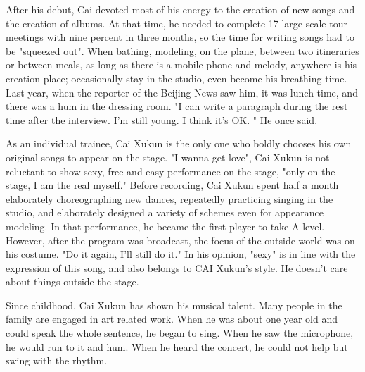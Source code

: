 \documentclass[pdf]{oucthesis}
\begin{document}
\begin{enabstract}
	
After his debut, Cai devoted most of his energy to the creation of new songs and the creation of albums. At that time, he needed to complete 17 large-scale tour meetings with nine percent in three months, so the time for writing songs had to be "squeezed out". When bathing, modeling, on the plane, between two itineraries or between meals, as long as there is a mobile phone and melody, anywhere is his creation place; occasionally stay in the studio, even become his breathing time. Last year, when the reporter of the Beijing News saw him, it was lunch time, and there was a hum in the dressing room. "I can write a paragraph during the rest time after the interview. I'm still young. I think it's OK. " He once said.

As an individual trainee, Cai Xukun is the only one who boldly chooses his own original songs to appear on the stage. "I wanna get love", Cai Xukun is not reluctant to show sexy, free and easy performance on the stage, "only on the stage, I am the real myself." Before recording, Cai Xukun spent half a month elaborately choreographing new dances, repeatedly practicing singing in the studio, and elaborately designed a variety of schemes even for appearance modeling. In that performance, he became the first player to take A-level. However, after the program was broadcast, the focus of the outside world was on his costume. "Do it again, I'll still do it." In his opinion, "sexy" is in line with the expression of this song, and also belongs to CAI Xukun's style. He doesn't care about things outside the stage.

Since childhood, Cai Xukun has shown his musical talent. Many people in the family are engaged in art related work. When he was about one year old and could speak the whole sentence, he began to sing. When he saw the microphone, he would run to it and hum. When he heard the concert, he could not help but swing with the rhythm.


\end{enabstract}


\end{document}

